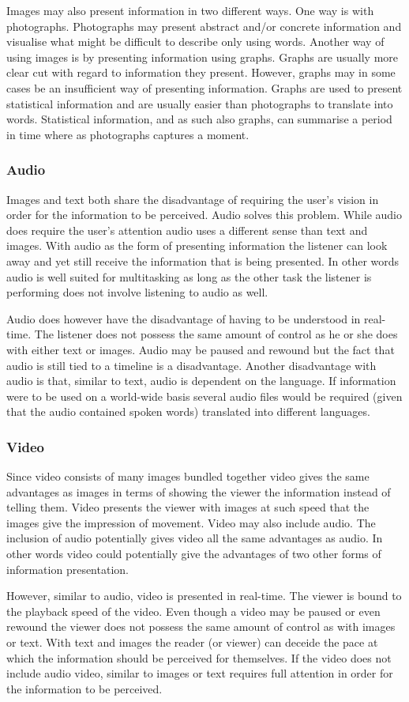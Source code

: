 Images may also present information in two different ways. One way is with photographs. Photographs may present abstract and/or concrete information and visualise what might be difficult to describe only using words. Another way of using images is by presenting information using graphs. Graphs are usually more clear cut with regard to information they present. However, graphs may in some cases be an insufficient way of presenting information. Graphs are used to present statistical information and are usually easier than photographs to translate into words. Statistical information, and as such also graphs, can summarise a period in time where as photographs captures a moment. 

\subsubsection{Audio}
Images and text both share the disadvantage of requiring the user's vision in order for the information to be perceived. Audio solves this problem. While audio does require the user's attention audio uses a different sense than text and images. With audio as the form of presenting information the listener can look away and yet still receive the information that is being presented. In other words audio is well suited for multitasking as long as the other task the listener is performing does not involve listening to audio as well.

Audio does however have the disadvantage of having to be understood in real-time. The listener does not possess the same amount of control as he or she does with either text or images. Audio may be paused and rewound but the fact that audio is still tied to a timeline is a disadvantage. Another disadvantage with audio is that, similar to text, audio is dependent on the language. If information were to be used on a world-wide basis several audio files would be required (given that the audio contained spoken words) translated into different languages.

\subsubsection{Video}
Since video consists of many images bundled together video gives the same advantages as images in terms of showing the viewer the information instead of telling them. Video presents the viewer with images at such speed that the images give the impression of movement. Video may also include audio. The inclusion of audio potentially gives video all the same advantages as audio. In other words video could potentially give the advantages of two other forms of information presentation.

However, similar to audio, video is presented in real-time. The viewer is bound to the playback speed of the video. Even though a video may be paused or even rewound the viewer does not possess the same amount of control as with images or text. With text and images the reader (or viewer) can deceide the pace at which the information should be perceived for themselves. If the video does not include audio video, similar to images or text requires full attention in order for the information to be perceived.